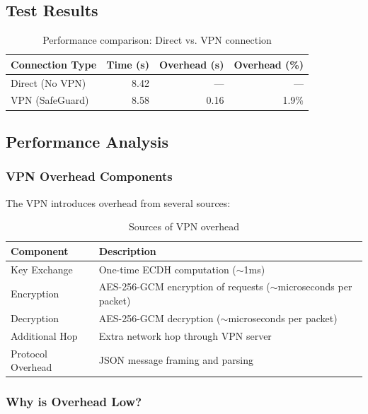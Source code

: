 \documentclass[12pt,a4paper]{article}
\begin{document}
\subsection{Test Results}

\begin{table}[H]
\centering
\begin{tabular}{@{}lrrr@{}}
\toprule
\textbf{Connection Type} & \textbf{Time (s)} & \textbf{Overhead (s)} & \textbf{Overhead (\%)} \\ \midrule
Direct (No VPN) & 8.42 & --- & --- \\
VPN (SafeGuard) & 8.58 & 0.16 & 1.9\% \\
\bottomrule
\end{tabular}
\caption{Performance comparison: Direct vs. VPN connection}
\end{table}

\subsection{Performance Analysis}

\subsubsection{VPN Overhead Components}

The VPN introduces overhead from several sources:

\begin{table}[H]
\centering
\begin{tabular}{@{}lp{9cm}@{}}
\toprule
\textbf{Component} & \textbf{Description} \\ \midrule
Key Exchange & One-time ECDH computation ($\sim$1ms) \\
Encryption & AES-256-GCM encryption of requests ($\sim$microseconds per packet) \\
Decryption & AES-256-GCM decryption ($\sim$microseconds per packet) \\
Additional Hop & Extra network hop through VPN server \\
Protocol Overhead & JSON message framing and parsing \\
\bottomrule
\end{tabular}
\caption{Sources of VPN overhead}
\end{table}

\subsubsection{Why is Overhead Low?}
\end{document}
